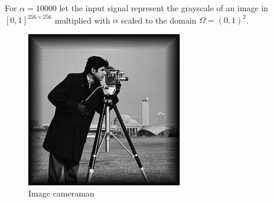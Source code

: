 \begin{frame}
  For $\alpha = 10000$ let the input signal represent the grayscale of an image
  in $[0,1]^{256\times 256}$ multiplied with $\alpha$ scaled to the domain
  $\Omega=(0,1)^2$.

  \begin{figure}[!ht]
    \centering
    \includegraphics[width=.5\linewidth]
      {pictures/experiments/settings/images/f2bcameraman.png}
    \caption*{Image cameraman}
  \end{figure}
\end{frame}

